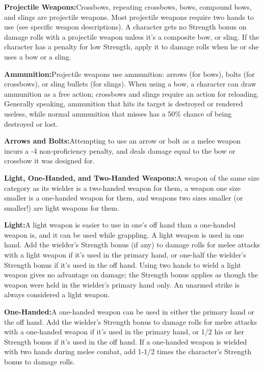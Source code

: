 \noindent\textbf{Projectile Weapons:}{Crossbows, repeating crossbows, bows, compound bows, and slings are projectile weapons. Most projectile weapons require two hands to use (see specific weapon descriptions). A character gets no Strength bonus on damage rolls with a projectile weapon unless it’s a composite bow, or sling. If the character has a penalty for low Strength, apply it to damage rolls when he or she uses a bow or a sling.}

\noindent\textbf{Ammunition:}{Projectile weapons use ammunition: arrows (for bows), bolts (for crossbows), or sling bullets (for slings). When using a bow, a character can draw ammunition as a free action; crossbows and slings require an action for reloading. Generally speaking, ammunition that hits its target is destroyed or rendered useless, while normal ammunition that misses has a 50\% chance of being destroyed or lost.}

\noindent\textbf{Arrows and Bolts:}{Attempting to use an arrow or bolt as a melee weapon incurs a -4 non-proficiency penalty, and deals damage equal to the bow or crossbow it was designed for.}

\noindent\textbf{Light, One-Handed, and Two-Handed Weapons:}{A weapon of the same size category as its wielder is a two-handed weapon for them, a weapon one size smaller is a one-handed weapon for them, and weapons two sizes smaller (or smaller!) are light weapons for them.}

\noindent\textbf{Light:}{A light weapon is easier to use in one’s off hand than a one-handed weapon is, and it can be used while grappling. A light weapon is used in one hand. Add the wielder’s Strength bonus (if any) to damage rolls for melee attacks with a light weapon if it’s used in the primary hand, or one-half the wielder’s Strength bonus if it’s used in the off hand. Using two hands to wield a light weapon gives no advantage on damage; the Strength bonus applies as though the weapon were held in the wielder’s primary hand only. An unarmed strike is always considered a light weapon.}

\noindent\textbf{One-Handed:}{A one-handed weapon can be used in either the primary hand or the off hand. Add the wielder’s Strength bonus to damage rolls for melee attacks with a one-handed weapon if it’s used in the primary hand, or 1/2 his or her Strength bonus if it’s used in the off hand. If a one-handed weapon is wielded with two hands during melee combat, add 1-1/2 times the character’s Strength bonus to damage rolls.}

